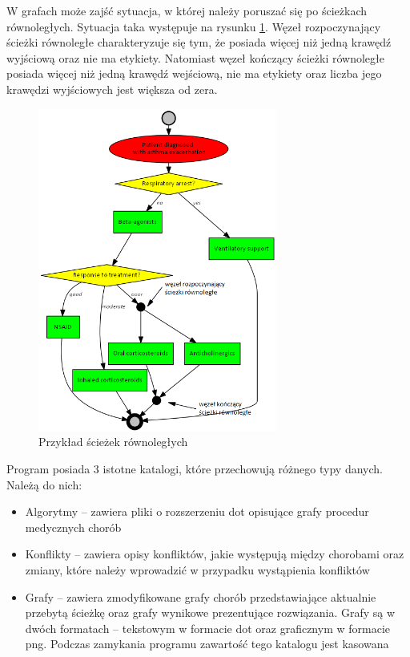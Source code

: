 W grafach może zajść sytuacja, w której należy poruszać się po ścieżkach równoległych. Sytuacja taka występuje na rysunku \ref{fig:sciezki_rownolegle}. Węzeł rozpoczynający ścieżki równoległe charakteryzuje się tym, że posiada więcej niż jedną krawędź wyjściową oraz nie ma etykiety. Natomiast węzeł kończący ścieżki równoległe posiada więcej niż jedną krawędź wejściową, nie ma etykiety oraz liczba jego krawędzi wyjściowych jest większa od zera.
\begin{figure}[H]
\centering
\includegraphics[width=0.7\textwidth]{img/asthma_sciezki_rownolegle.png}
\caption{Przykład ścieżek równoległych}
\label{fig:sciezki_rownolegle}
\end{figure}

Program posiada 3 istotne katalogi, które przechowują różnego typy danych. Należą do nich:
\begin{itemize}
\item{Algorytmy – zawiera pliki o rozszerzeniu dot opisujące grafy procedur medycznych chorób}
\item{Konflikty – zawiera opisy konfliktów, jakie występują między chorobami oraz zmiany, które należy wprowadzić w przypadku wystąpienia konfliktów}
\item{Grafy – zawiera zmodyfikowane grafy chorób przedstawiające aktualnie przebytą ścieżkę oraz grafy wynikowe prezentujące rozwiązania. Grafy są w dwóch formatach – tekstowym w formacie dot oraz graficznym w formacie png. Podczas zamykania programu zawartość tego katalogu jest kasowana}
\end{itemize}

